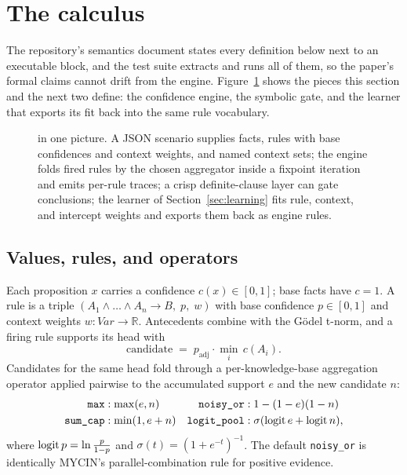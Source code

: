\section{The \pla{} calculus}\label{sec:calculus}

The repository's semantics document states every definition below next
to an executable block, and the test suite extracts and runs all of
them, so the paper's formal claims cannot drift from the engine.
Figure~\ref{fig:overview} shows the pieces this section and the next
two define: the confidence engine, the symbolic gate, and the learner
that exports its fit back into the same rule vocabulary.

\begin{figure}[t]
\centering
{\linespread{1}\selectfont\small
}
\caption{\pla{} in one picture. A JSON scenario supplies facts, rules
with base confidences and context weights, and named context sets; the
engine folds fired rules by the chosen aggregator inside a fixpoint
iteration and emits per-rule traces; a crisp definite-clause layer can
gate conclusions; the learner of Section~\ref{sec:learning} fits rule,
context, and intercept weights and exports them back as engine rules.}
\label{fig:overview}
\end{figure}

\subsection{Values, rules, and operators}

Each proposition $x$ carries a confidence $c(x)\in[0,1]$; base facts
have $c=1$. A rule is a triple
$(A_1\wedge\dots\wedge A_n \rightarrow B,\; p,\; w)$ with base
confidence $p\in[0,1]$ and context weights $w:\mathit{Var}\to\mathbb{R}$.
Antecedents combine with the G\"odel t-norm, and a firing rule supports
its head with
\begin{equation}
\text{candidate} \;=\; p_{\text{adj}} \cdot \min_i\, c(A_i).
\label{eq:candidate}
\end{equation}
Candidates for the same head fold through a per-knowledge-base
aggregation operator applied pairwise to the accumulated support $e$ and
the new candidate $n$:
\begin{equation}
\begin{aligned}
\texttt{max}&: \max(e,n) &
\texttt{noisy\_or}&: 1-(1-e)(1-n)\\
\texttt{sum\_cap}&: \min(1, e+n) &
\texttt{logit\_pool}&: \sigma(\operatorname{logit} e + \operatorname{logit} n),
\end{aligned}
\label{eq:aggregators}
\end{equation}
where $\operatorname{logit} p = \ln\frac{p}{1-p}$ and $\sigma(t) = (1+e^{-t})^{-1}$.
The default \texttt{noisy\_or} is identically MYCIN's
parallel-combination rule for positive evidence.

